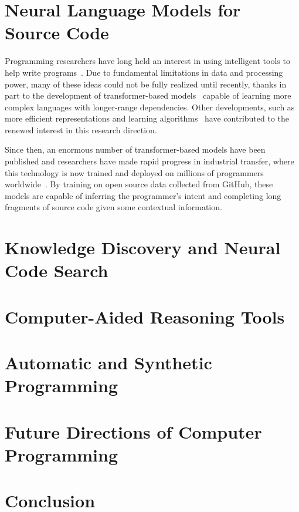 \documentclass[10pt]{article}
\begin{document}
  \section{Neural Language Models for Source Code}

Programming researchers have long held an interest in using intelligent tools to help write programs~\cite{bras1993artificial}. Due to fundamental limitations in data and processing power, many of these ideas could not be fully realized until recently, thanks in part to the development of transformer-based models~\cite{vaswani2017attention} capable of learning more complex languages with longer-range dependencies. Other developments, such as more efficient representations and learning algorithms~\cite{allamanis2018survey} have contributed to the renewed interest in this research direction.

Since then, an enormous number of transformer-based models have been published and researchers have made rapid progress in industrial transfer, where this technology is now trained and deployed on millions of programmers worldwide~\cite{chen2021evaluating}. By training on open source data collected from GitHub, these models are capable of inferring the programmer's intent and completing long fragments of source code given some contextual information.

  \section{Knowledge Discovery and Neural Code Search}

  \section{Computer-Aided Reasoning Tools}

  \section{Automatic and Synthetic Programming}

  \section{Future Directions of Computer Programming}

  \section{Conclusion}

  
  
\end{document}
